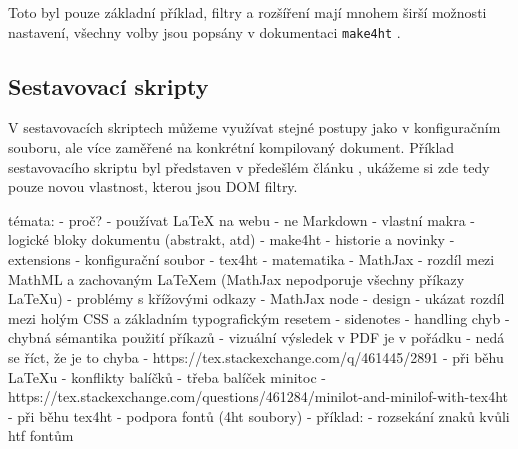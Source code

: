 \documentclass{csbulletin}
\newcommand\prikaz[1]{\texttt{#1}}
\begin{document}
Toto byl pouze základní příklad, filtry a rozšíření mají mnohem širší možnosti
nastavení, všechny volby jsou popsány v dokumentaci \prikaz{make4ht} \parencite{make4ht}.


\subsection{Sestavovací skripty}


V sestavovacích skriptech můžeme využívat stejné postupy jako v konfiguračním souboru, ale více zaměřené na konkrétní kompilovaný dokument. Příklad sestavovacího skriptu byl představen v předešlém článku \parencite[s. 95]{hoftich:16}, ukážeme si zde tedy pouze novou vlastnost, kterou jsou DOM filtry.




témata:
- proč?
  - používat LaTeX na webu
  - ne Markdown
    - vlastní makra
    - logické bloky dokumentu (abstrakt, atd)
- make4ht
  - historie a novinky
  - extensions
  - konfigurační soubor
- tex4ht
  - matematika
    - MathJax
      - rozdíl mezi MathML a zachovaným LaTeXem (MathJax nepodporuje všechny příkazy LaTeXu)
      - problémy s křížovými odkazy
    - MathJax node
  - design
    - ukázat rozdíl mezi holým CSS a základním typografickým resetem
    - sidenotes
  - handling chyb
    - chybná sémantika použití příkazů
      - vizuální výsledek v PDF je v pořádku - nedá se říct, že je to chyba
        - https://tex.stackexchange.com/q/461445/2891
    - při běhu LaTeXu 
      - konflikty balíčků
        - třeba balíček minitoc
          - https://tex.stackexchange.com/questions/461284/minilot-and-minilof-with-tex4ht
    - při běhu tex4ht
      - podpora fontů (4ht soubory)
    - příklad:
      - rozsekání znaků kvůli htf fontům

\printbibliography
\begin{summary}

\end{summary}
\end{document}
